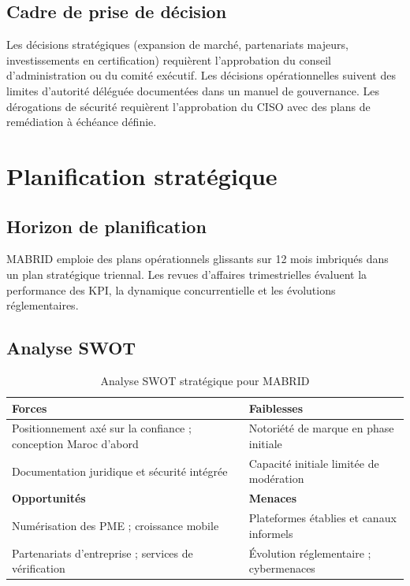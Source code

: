 \subsection{Cadre de prise de décision}

Les décisions stratégiques (expansion de marché, partenariats majeurs, investissements en certification) requièrent l'approbation du conseil d'administration ou du comité exécutif. Les décisions opérationnelles suivent des limites d'autorité déléguée documentées dans un manuel de gouvernance. Les dérogations de sécurité requièrent l'approbation du CISO avec des plans de remédiation à échéance définie.

\section{Planification stratégique}

\subsection{Horizon de planification}

MABRID emploie des plans opérationnels glissants sur 12 mois imbriqués dans un plan stratégique triennal. Les revues d'affaires trimestrielles évaluent la performance des KPI, la dynamique concurrentielle et les évolutions réglementaires.

\subsection{Analyse SWOT}

\begin{table}[H]
  \centering
  \caption{Analyse SWOT stratégique pour MABRID}
  \label{tab:swot}
  \begin{tabularx}{\textwidth}{@{}XX@{}}
    \toprule
    \textbf{Forces} & \textbf{Faiblesses} \\
    \midrule
    Positionnement axé sur la confiance ; conception Maroc d'abord & Notoriété de marque en phase initiale \\
    Documentation juridique et sécurité intégrée & Capacité initiale limitée de modération \\
    \addlinespace
    \textbf{Opportunités} & \textbf{Menaces} \\
    \midrule
    Numérisation des PME ; croissance mobile & Plateformes établies et canaux informels \\
    Partenariats d'entreprise ; services de vérification & Évolution réglementaire ; cybermenaces \\
    \bottomrule
  \end{tabularx}
\end{table}

